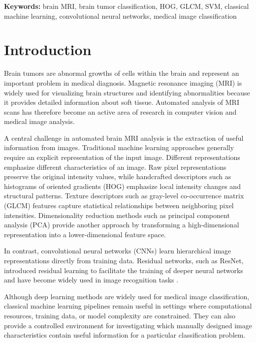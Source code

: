 \documentclass[11pt,a4paper]{article}
\begin{document}

\noindent
\textbf{Keywords:}
brain MRI, brain tumor classification, HOG, GLCM, SVM,
classical machine learning, convolutional neural networks,
medical image classification


\section{Introduction}

Brain tumors are abnormal growths of cells within the brain and represent an important problem in medical diagnosis. Magnetic resonance imaging (MRI) is widely used for visualizing brain structures and identifying abnormalities because it provides detailed information about soft tissue. Automated analysis of MRI scans has therefore become an active area of research in computer vision and medical image analysis.

A central challenge in automated brain MRI analysis is the extraction of useful information from images. Traditional machine learning approaches generally require an explicit representation of the input image. Different representations emphasize different characteristics of an image. Raw pixel representations preserve the original intensity values, while handcrafted descriptors such as histograms of oriented gradients (HOG) emphasize local intensity changes and structural patterns. Texture descriptors such as gray-level co-occurrence matrix (GLCM) features capture statistical relationships between neighboring pixel intensities. Dimensionality reduction methods such as principal component analysis (PCA) provide another approach by transforming a high-dimensional representation into a lower-dimensional feature space.

In contrast, convolutional neural networks (CNNs) learn hierarchical image representations directly from training data. Residual networks, such as ResNet, introduced residual learning to facilitate the training of deeper neural networks and have become widely used in image recognition tasks \cite{he2016deep}.

Although deep learning methods are widely used for medical image classification, classical machine learning pipelines remain useful in settings where computational resources, training data, or model complexity are constrained. They can also provide a controlled environment for investigating which manually designed image characteristics contain useful information for a particular classification problem.
\end{document}
